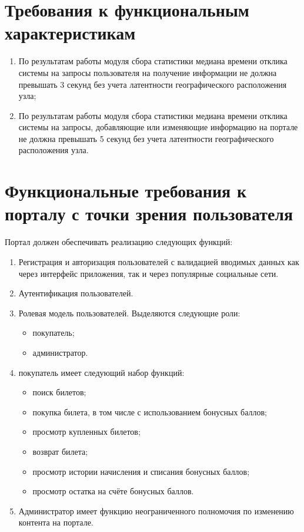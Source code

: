 \section*{Требования к функциональным характеристикам}

\begin{enumerate}
	\item По результатам работы модуля сбора статистики медиана времени отклика системы на запросы пользователя на получение информации не должна превышать 3 секунд без учета латентности географического расположения узла;
	\item По результатам работы модуля сбора статистики медиана времени отклика системы на запросы, добавляющие или изменяющие информацию на портале не должна превышать 5 секунд без учета латентности географического расположения узла.
\end{enumerate}

\section*{Функциональные требования к порталу с точки зрения пользователя}

Портал должен обеспечивать реализацию следующих функций:
\begin{enumerate}
	\item Регистрация и авторизация пользователей с валидацией вводимых данных как через интерфейс приложения, так и через популярные социальные сети.
	\item Аутентификация пользователей.
	\item Ролевая модель пользователей. Выделяются следующие роли:
	\begin{itemize}
		\item покупатель;
		\item администратор.
	\end{itemize}
	\item покупатель имеет следующий набор функций:
	\begin{itemize}
		\item поиск билетов;
        \item покупка билета, в том числе с использованием бонусных баллов;
        \item просмотр купленных билетов;
		\item возврат билета;
        \item просмотр истории начисления и списания бонусных баллов;
        \item просмотр остатка на счёте бонусных баллов.
	\end{itemize}
	\item Администратор имеет функцию неограниченного полномочия по изменению контента на портале.
\end{enumerate}

